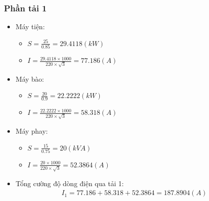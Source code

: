         \subsubsection{Phần tải 1}
            \begin{itemize}
                \item Máy tiện: 
                    \begin{itemize}
                        \item $S = \frac{25}{0.85} = 29.4118 (kW)$
                        \item $I = \frac{29.4118 \times 1000}{220 \times \sqrt{3}} = 77.186 (A)$
                    \end{itemize}
                \item Máy bào: 
                    \begin{itemize}
                        \item $S = \frac{20}{0.9} = 22.2222 (kW)$
                        \item $I = \frac{22.2222 \times 1000}{220 \times \sqrt{3}} = 58.318 (A)$
                    \end{itemize}
                \item Máy phay:
                    \begin{itemize}
                        \item $S = \frac{15}{0.75} = 20 (kVA)$
                        \item $I = \frac{20 \times 1000}{220 \times \sqrt{3}} = 52.3864 (A)$
                    \end{itemize}
                \item Tổng cường độ dòng điện qua tải 1:
                    \begin{align*}
                        I_{1} = 77.186 + 58.318 + 52.3864 = 187.8904 (A)
                    \end{align*} 
            \end{itemize}
